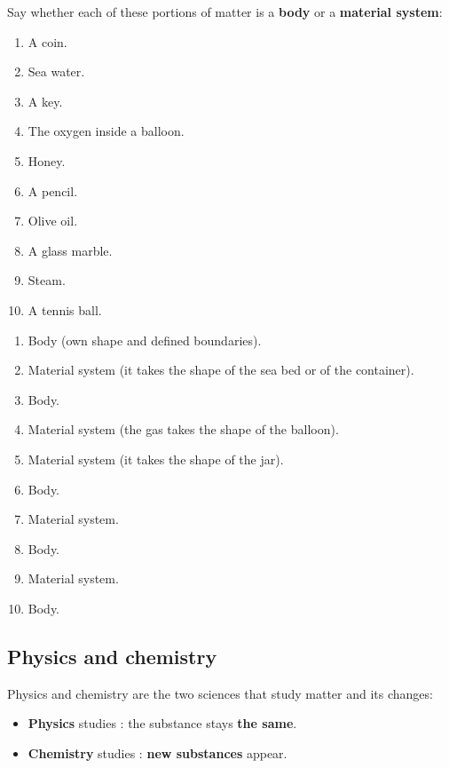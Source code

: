 \begin{exercise}
    Say whether each of these portions of matter is a \textbf{body} or a \textbf{material system}:
    \begin{enumerate}[label=\letraminuscula]
        \item A coin.
        \item Sea water.
        \item A key.
        \item The oxygen inside a balloon.
        \item Honey.
        \item A pencil.
        \item Olive oil.
        \item A glass marble.
        \item Steam.
        \item A tennis ball.
    \end{enumerate}
    \begin{solu}
        \begin{enumerate}[label=\alph*)]
            \item Body (own shape and defined boundaries).
            \item Material system (it takes the shape of the sea bed or of the container).
            \item Body.
            \item Material system (the gas takes the shape of the balloon).
            \item Material system (it takes the shape of the jar).
            \item Body.
            \item Material system.
            \item Body.
            \item Material system.
            \item Body.
        \end{enumerate}
    \end{solu}
\end{exercise}

\subsection{Physics and chemistry}

Physics and chemistry are the two sciences that study matter and its changes:

\begin{itemize}
    \item \textbf{Physics} studies : the substance stays \textbf{the same}.
    \item \textbf{Chemistry} studies : \textbf{new substances} appear.
\end{itemize}

